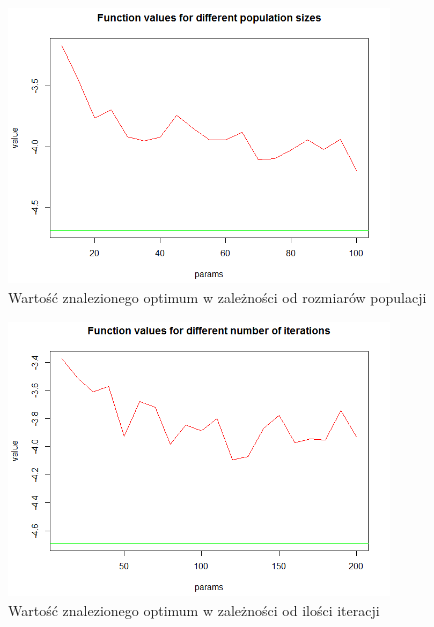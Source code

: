 \documentclass[11pt, a4paper]{article}
\begin{document}
\begin{figure}[H]
	\begin{center}
		\includegraphics[width=0.9\textwidth]{./assets/EMichalewicz5.png} %
		\caption{Wartość znalezionego optimum w zależności od rozmiarów populacji}
		\label{fig:emichalewicz5}
	\end{center}
\end{figure}

\begin{figure}[H]
	\begin{center}
		\includegraphics[width=0.9\textwidth]{./assets/EMichalewicz6.png} %
		\caption{Wartość znalezionego optimum w zależności od ilości iteracji}
		\label{fig:emichalewicz6}
	\end{center}
\end{figure}
\end{document}
